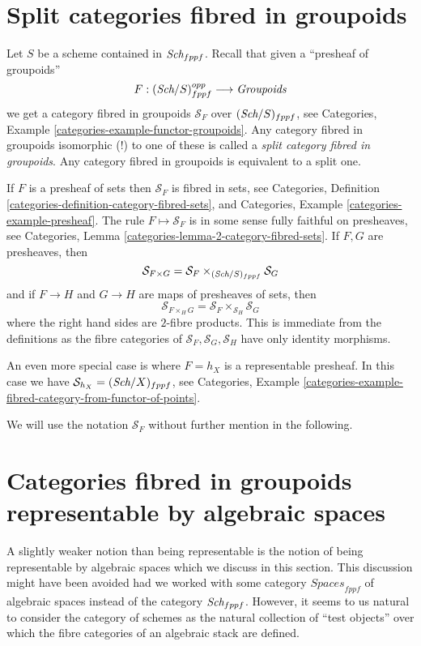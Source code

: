 \section{Split categories fibred in groupoids}
\label{section-split}

\noindent
Let $S$ be a scheme contained in $\textit{Sch}_{fppf}$.
Recall that given a ``presheaf of groupoids''
$$
F : (\textit{Sch}/S)_{fppf}^{opp} \longrightarrow \textit{Groupoids}
$$
we get a category fibred in groupoids $\mathcal{S}_F$ over
$(\textit{Sch}/S)_{fppf}$, see
Categories, Example \ref{categories-example-functor-groupoids}.
Any category fibred in groupoids isomorphic (!) to one of these
is called a {\it split category fibred in groupoids}.
Any category fibred in groupoids is equivalent to a split one.

\medskip\noindent
If $F$ is a presheaf of sets then $\mathcal{S}_F$ is
fibred in sets, see
Categories,
Definition \ref{categories-definition-category-fibred-sets},
and
Categories, Example \ref{categories-example-presheaf}.
The rule $F \mapsto \mathcal{S}_F$ is in some sense fully faithful
on presheaves, see
Categories, Lemma \ref{categories-lemma-2-category-fibred-sets}.
If $F, G$ are presheaves, then
$$
\mathcal{S}_{F \times G}
=
\mathcal{S}_F \times_{(\textit{Sch}/S)_{fppf}} \mathcal{S}_G
$$
and if $F \to H$ and $G \to H$ are maps of presheaves of sets, then
$$
\mathcal{S}_{F \times_H G} =
\mathcal{S}_F \times_{\mathcal{S}_H} \mathcal{S}_G
$$
where the right hand sides are $2$-fibre products. This is immediate
from the definitions as the fibre categories of
$\mathcal{S}_F, \mathcal{S}_G, \mathcal{S}_H$ have only identity morphisms.

\medskip\noindent
An even more special case is where $F = h_X$ is a representable
presheaf. In this case we have
$\mathcal{S}_{h_X} = (\textit{Sch}/X)_{fppf}$, see
Categories,
Example \ref{categories-example-fibred-category-from-functor-of-points}.

\medskip\noindent
We will use the notation $\mathcal{S}_F$ without further mention in the
following.




\section{Categories fibred in groupoids representable by algebraic spaces}
\label{section-representable-by-algebraic-spaces}

\noindent
A slightly weaker notion than being representable is the notion of
being representable by algebraic spaces which we discuss in this section.
This discussion might have been avoided had we worked with some category
$\textit{Spaces}_{fppf}$ of algebraic spaces instead of the category
$\textit{Sch}_{fppf}$. However, it seems to us natural to consider the
category of schemes as the natural collection of ``test objects'' over
which the fibre categories of an algebraic stack are defined.

